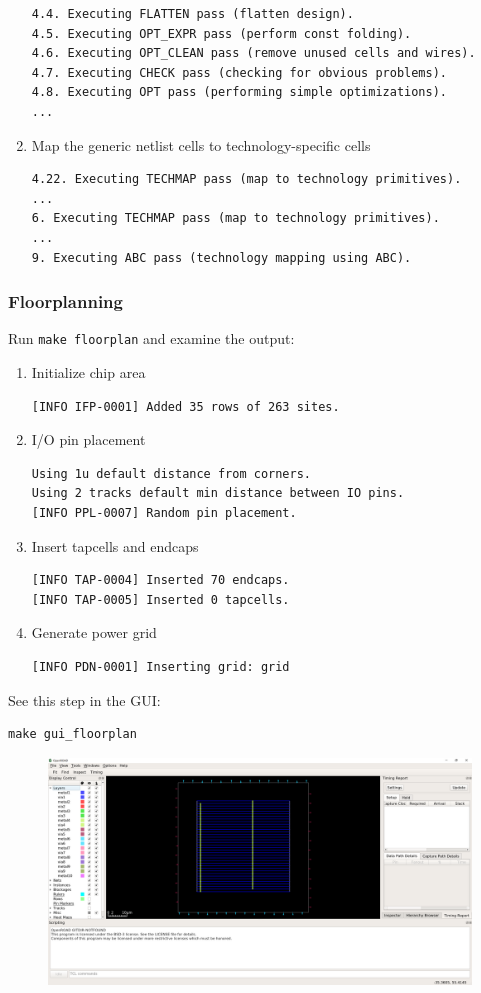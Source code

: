 \documentclass[a4paper,12pt,twoside]{article}
\begin{document}
\begin{enumerate}
\begin{verbatim}
4.4. Executing FLATTEN pass (flatten design).
4.5. Executing OPT_EXPR pass (perform const folding).
4.6. Executing OPT_CLEAN pass (remove unused cells and wires).
4.7. Executing CHECK pass (checking for obvious problems).
4.8. Executing OPT pass (performing simple optimizations).
...
    \end{verbatim}
    \item Map the generic netlist cells to technology-specific cells
    \begin{verbatim}
4.22. Executing TECHMAP pass (map to technology primitives).
...
6. Executing TECHMAP pass (map to technology primitives).
...
9. Executing ABC pass (technology mapping using ABC).
    \end{verbatim}
\end{enumerate}
\subsubsection{Floorplanning}
Run \texttt{make floorplan} and examine the output:
\begin{enumerate}
    \item Initialize chip area
    \begin{verbatim}
[INFO IFP-0001] Added 35 rows of 263 sites.
    \end{verbatim}
    \item I/O pin placement
    \begin{verbatim}
Using 1u default distance from corners.
Using 2 tracks default min distance between IO pins.
[INFO PPL-0007] Random pin placement.
    \end{verbatim}
    \item Insert tapcells and endcaps
    \begin{verbatim}
[INFO TAP-0004] Inserted 70 endcaps.
[INFO TAP-0005] Inserted 0 tapcells.
    \end{verbatim}
    \item Generate power grid
    \begin{verbatim}
[INFO PDN-0001] Inserting grid: grid
    \end{verbatim}
\end{enumerate}
See this step in the GUI:
\begin{verbatim}
make gui_floorplan
\end{verbatim}
\begin{figure}[H]
    \centering
    \includegraphics[width=\textwidth]{images/1.png}
\end{figure}
\end{document}
